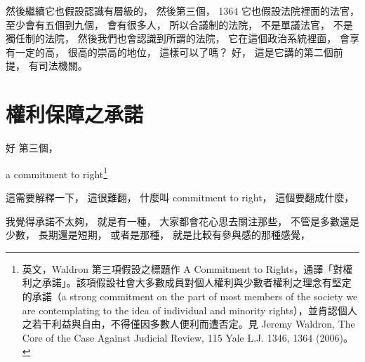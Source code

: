 \hypertarget{w06:cue:1716}{}然後繼續它也假設認識有層級的，
\hypertarget{w06:cue:1717}{}然後第三個，
\hypertarget{w06:cue:1718}{}1364 它也假設法院裡面的法官，
\hypertarget{w06:cue:1719}{}至少會有五個到九個，
\hypertarget{w06:cue:1720}{}會有很多人，
\hypertarget{w06:cue:1721}{}所以合議制的法院，
\hypertarget{w06:cue:1722}{}不是單議法官，
\hypertarget{w06:cue:1723}{}不是獨任制的法院，
\hypertarget{w06:cue:1724}{}然後我們也會認識到所謂的法院，
\hypertarget{w06:cue:1725}{}它在這個政治系統裡面，
\hypertarget{w06:cue:1726}{}會享有一定的高，
\hypertarget{w06:cue:1727}{}很高的崇高的地位，
\hypertarget{w06:cue:1728}{}這樣可以了嗎？
\hypertarget{w06:cue:1729}{}好，
\hypertarget{w06:cue:1730}{}這是它講的第二個前提，
\hypertarget{w06:cue:1731}{}有司法機關。

\section{權利保障之承諾}

\hypertarget{w06:cue:1732}{}好 第三個，

\hypertarget{w06:cue:1733}{}a commitment to right\footnote{英文，Waldron 第三項假設之標題作 A Commitment to Rights，通譯「對權利之承諾」。該項假設社會大多數成員對個人權利與少數者權利之理念有堅定的承諾（a strong commitment on the part of most members of the society we are contemplating to the idea of individual and minority rights），並肯認個人之若干利益與自由，不得僅因多數人便利而遭否定。見 Jeremy Waldron, The Core of the Case Against Judicial Review, 115 Yale L.J. 1346, 1364 (2006)。}

\hypertarget{w06:cue:1734}{}這需要解釋一下，
\hypertarget{w06:cue:1735}{}這很難翻，
\hypertarget{w06:cue:1736}{}什麼叫 commitment to right，
\hypertarget{w06:cue:1737}{}這個要翻成什麼，

\hypertarget{w06:cue:1738}{}我覺得承諾不太夠，
\hypertarget{w06:cue:1739}{}就是有一種，
\hypertarget{w06:cue:1740}{}大家都會花心思去關注那些，
\hypertarget{w06:cue:1741}{}不管是多數還是少數，
\hypertarget{w06:cue:1742}{}長期還是短期，
\hypertarget{w06:cue:1743}{}或者是那種，
\hypertarget{w06:cue:1744}{}就是比較有參與感的那種感覺，

